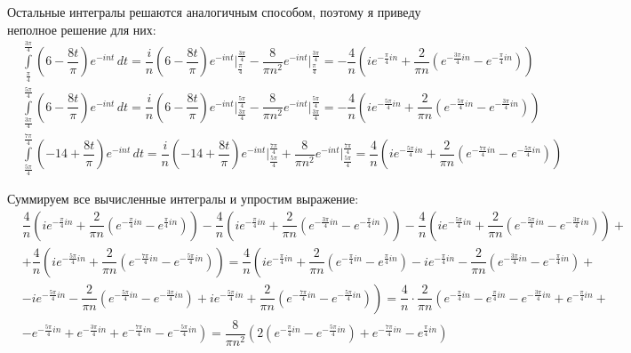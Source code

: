 \documentclass[a4paper, 16pt]{article}
\begin{document}
\noindent Остальные интегралы решаются аналогичным способом, поэтому я приведу неполное решение для них:
\begin{align*}
    & \int\limits_{\frac{\pi}{4}}^{\frac{3\pi}{4}}\left(6-\dfrac{8t}{\pi}\right)e^{-int}\,dt=\dfrac{i}{n}\left(6-\dfrac{8t}{\pi}\right)e^{-int}\bigg|_{\frac{\pi}{4}}^{\frac{3\pi}{4}}-\dfrac{8}{\pi n^2}e^{-int}\bigg|_{\frac{\pi}{4}}^{\frac{3\pi}{4}}=-\dfrac{4}{n}\left(ie^{-\frac{\pi}{4}in}+\dfrac{2}{\pi n}\left(e^{-\frac{3\pi}{4}in}-e^{-\frac{\pi}{4}in}\right)\right)\\
    & \int\limits_{\frac{3\pi}{4}}^{\frac{5\pi}{4}}\left(6-\dfrac{8t}{\pi}\right)e^{-int}\,dt=\dfrac{i}{n}\left(6-\dfrac{8t}{\pi}\right)e^{-int}\bigg|_{\frac{3\pi}{4}}^{\frac{5\pi}{4}}-\dfrac{8}{\pi n^2}e^{-int}\bigg|_{\frac{3\pi}{4}}^{\frac{5\pi}{4}}=-\dfrac{4}{n}\left(ie^{-\frac{5\pi}{4}in}+\dfrac{2}{\pi n}\left(e^{-\frac{5\pi}{4}in}-e^{-\frac{3\pi}{4}in}\right)\right)\\
    & \int\limits_{\frac{5\pi}{4}}^{\frac{7\pi}{4}}\left(-14+\dfrac{8t}{\pi}\right)e^{-int}\,dt=\dfrac{i}{n}\left(-14+\dfrac{8t}{\pi}\right)e^{-int}\bigg|_{\frac{5\pi}{4}}^{\frac{7\pi}{4}}+\dfrac{8}{\pi n^2}e^{-int}\bigg|_{\frac{5\pi}{4}}^{\frac{7\pi}{4}}=\dfrac{4}{n}\left(ie^{-\frac{5\pi}{4}in}+\dfrac{2}{\pi n}\left(e^{-\frac{7\pi}{4}in}-e^{-\frac{5\pi}{4}in}\right)\right)
\end{align*}


\noindent Суммируем все вычисленные интегралы и упростим выражение:
\begin{align*}
    & \dfrac{4}{n}\left(ie^{-\frac{\pi}{4}in}+\dfrac{2}{\pi n}\left(e^{-\frac{\pi}{4}in}-e^{\frac{\pi}{4}in}\right)\right)-\dfrac{4}{n}\left(ie^{-\frac{\pi}{4}in}+\dfrac{2}{\pi n}\left(e^{-\frac{3\pi}{4}in}-e^{-\frac{\pi}{4}in}\right)\right)-\dfrac{4}{n}\left(ie^{-\frac{5\pi}{4}in}+\dfrac{2}{\pi n}\left(e^{-\frac{5\pi}{4}in}-e^{-\frac{3\pi}{4}in}\right)\right)+\\
    & +\dfrac{4}{n}\left(ie^{-\frac{5\pi}{4}in}+\dfrac{2}{\pi n}\left(e^{-\frac{7\pi}{4}in}-e^{-\frac{5\pi}{4}in}\right)\right)=\dfrac{4}{n}\left(ie^{-\frac{\pi}{4}in}+\dfrac{2}{\pi n}\left(e^{-\frac{\pi}{4}in}-e^{\frac{\pi}{4}in}\right)-ie^{-\frac{\pi}{4}in}-\dfrac{2}{\pi n}\left(e^{-\frac{3\pi}{4}in}-e^{-\frac{\pi}{4}in}\right)+\right.\\
    & \left. -ie^{-\frac{5\pi}{4}in}-\dfrac{2}{\pi n}\left(e^{-\frac{5\pi}{4}in}-e^{-\frac{3\pi}{4}in}\right)+ie^{-\frac{5\pi}{4}in}+\dfrac{2}{\pi n}\left(e^{-\frac{7\pi}{4}in}-e^{-\frac{5\pi}{4}in}\right)\right)=\dfrac{4}{n}\cdot\dfrac{2}{\pi n}\left(e^{-\frac{\pi}{4}in}-e^{\frac{\pi}{4}in}-e^{-\frac{3\pi}{4}in}+e^{-\frac{\pi}{4}in}+\right.\\
    & \left. -e^{-\frac{5\pi}{4}in}+e^{-\frac{3\pi}{4}in}+e^{-\frac{7\pi}{4}in}-e^{-\frac{5\pi}{4}in}\right)=\dfrac{8}{\pi n^2}\left(2\left(e^{-\frac{\pi}{4}in}-e^{-\frac{5\pi}{4}in}\right)+e^{-\frac{7\pi}{4}in}-e^{\frac{\pi}{4}in}\right)
\end{align*}
\end{document}
